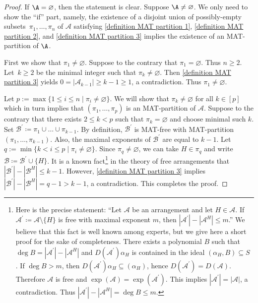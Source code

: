 \begin{proof}
If $ \A = \varnothing $, then the statement is clear. Suppose $ \A \ne \varnothing $. 
We only need to show the ``if'' part, namely, the existence of a disjoint union of  possibly-empty subsets~$ \pi_{1}, \dots, \pi_{n} $ of $ \mathcal{A} $ satisfying \ref{definition MAT partition 1}, \ref{definition MAT partition 2}, and \ref{definition MAT partition 3} implies the existence of an MAT-partition of $\A$.

First we show that $ \pi_{1} \neq \varnothing $. 
Suppose to the contrary that $ \pi_{1} = \varnothing $. 
Thus $n\ge2$.
Let~$ k \geq 2 $ be the minimal integer such that $ \pi_{k} \neq \varnothing $. 
Then \ref{definition MAT partition 3} yields $ 0 = |\mathcal{A}_{k-1}| \geq k-1 \geq 1 $, a contradiction. 
Thus $ \pi_{1} \neq \varnothing $. 

Let $p:= \max \{ 1 \le i\le n \mid \pi_i \ne\varnothing \}$.
We will show that  $\pi_{k} \neq \varnothing $ for all $ k \in [p] $ which in turn implies that $ (\pi_{1}, \dots, \pi_{p}) $ is an MAT-partition of $ \mathcal{A} $. 
Suppose to the contrary that there exists   $2\le  k< p$ such that $ \pi_{k} = \varnothing $ and choose minimal such $k$.
Set $ \mathcal{B}^{\prime} \coloneqq \pi_{1} \cup \dots \cup \pi_{k-1} $. 
By definition, $ \mathcal{B}^{\prime} $ is MAT-free with MAT-partition $ (\pi_{1}, \dots, \pi_{k-1}) $. 
Also, the maximal exponents of $ \mathcal{B}^{\prime} $ are equal to $ k-1 $. 
Let $q:= \min \{k<i \le p\mid \pi_i \ne\varnothing \}$.
Since $ \pi_{q} \neq \varnothing $, we can take $ H \in  \pi_{q}$ and write $ \mathcal{B} \coloneqq \mathcal{B}^{\prime} \cup \{H\} $. 
It is a known fact\footnote{Here is the precise statement: ``Let  $ \mathcal{A} $ be an arrangement and let $ H \in \mathcal{A} $. If $ \mathcal{A}^{\prime} \coloneqq \mathcal{A}\setminus\{H\} $ is free with maximal exponent $ m $, then $ |\mathcal{A}^{\prime}| - |\mathcal{A}^{H}| \leq m $.'' 
We believe that this fact is well known among experts, but we give here a short proof for the sake of completeness. 
There exists a polynomial $ B $ such that $ \deg B = |\mathcal{A}^{\prime}| - |\mathcal{A}^{H}| $ and $ D(\mathcal{A}^{\prime})\alpha_{H} $ is contained in the ideal $(\alpha_{H}, B) \subseteq S$ \cite[Lemma 4.39 and Proposition 4.41]{OT92}. 
If $ \deg B > m $, then $ D(\mathcal{A}^{\prime})\alpha_{H} \subseteq (\alpha_{H}) $, hence $ D(\mathcal{A}^{\prime}) = D(\mathcal{A}) $. 
Therefore $ \mathcal{A} $ is free and  $\exp (\mathcal{A} )=\exp (\mathcal{A}^{\prime} )$. 
This implies $ |\mathcal{A}^{\prime}| = |\mathcal{A}| $, a contradiction. 
Thus $ |\mathcal{A}^{\prime}| - |\mathcal{A}^{H}| = \deg B \leq m $.}
 in the theory of free arrangements that $ |\mathcal{B}^{\prime}| - |\mathcal{B}^{H}| \leq k-1$.
However, \ref{definition MAT partition 3} implies $ |\mathcal{B}^{\prime}| - |\mathcal{B}^{H}| = q-1 >k-1$, a contradiction. 
This completes the proof.
\end{proof}

